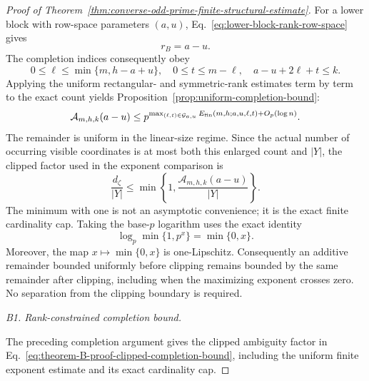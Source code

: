 \documentclass[11pt]{article}
\newcommand{\1}{\mathbf 1}
\theoremstyle{plain}
\theoremstyle{definition}
\theoremstyle{remark}
\begin{document}
\begin{proof}[Proof of Theorem~\ref{thm:converse-odd-prime-finite-structural-estimate}]
For a lower block with row-space parameters $(a,u)$,
Eq.~\eqref{eq:lower-block-rank-row-space} gives
\begin{equation}
 r_B=a-u.
 \label{eq:theorem-B-rB-au}
\end{equation}
The completion indices consequently obey
\begin{equation}
 0\le\ell\le\min\{m,h-a+u\},\quad
 0\le t\le m-\ell,\quad
 a-u+2\ell+t\le k.
 \label{eq:theorem-B-proof-finite-completion-ranges}
\end{equation}
Applying the uniform rectangular- and symmetric-rank estimates term by term to
the exact count yields Proposition~\ref{prop:uniform-completion-bound}:
\begin{equation}
 \mathcal A_{m,h,k}(a-u)
 \le
 p^{\max_{(\ell,t)\in\mathcal G_{a,u}}
 E_{\rm fin}(m,h;a,u,\ell,t)+O_p(\log n)}.
 \label{eq:theorem-B-proof-uniform-completion-bound}
\end{equation}
The remainder is uniform in the linear-size regime.  Since the actual number
of occurring visible coordinates is at most both this enlarged count and
$\lvert Y\rvert$, the clipped factor used in the exponent comparison is
\begin{equation}
 \frac{d_{\zeta}}{\lvert Y\rvert}
 \le
 \min\left\{1,
 \frac{\mathcal A_{m,h,k}(a-u)}{\lvert Y\rvert}\right\}.
 \label{eq:theorem-B-proof-clipped-completion-bound}
\end{equation}
The minimum with one is not an asymptotic convenience; it is the exact finite
cardinality cap.
Taking the base-$p$ logarithm uses the exact identity
\begin{equation}
 \log_p\min\{1,p^x\}=\min\{0,x\}.
 \label{eq:finite-clipping-log-identity}
\end{equation}
Moreover, the map $x\mapsto\min\{0,x\}$ is one-Lipschitz.  Consequently an
additive remainder bounded uniformly before clipping remains bounded by the
same remainder after clipping, including when the maximizing exponent crosses
zero.  No separation from the clipping boundary is required.

\smallskip
\noindent\emph{B1. Rank-constrained completion bound.}\par
The preceding completion argument gives the clipped ambiguity factor in
Eq.~\eqref{eq:theorem-B-proof-clipped-completion-bound}, including the
uniform finite exponent estimate and its exact cardinality cap.


\end{proof}
\end{document}
